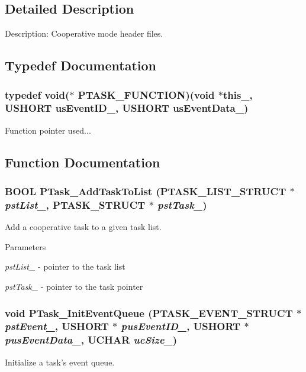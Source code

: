 \subsection{Detailed Description}
Description: Cooperative mode header files. 

\subsection{Typedef Documentation}
\subsubsection[{PTASK\_\-FUNCTION}]{\setlength{\rightskip}{0pt plus 5cm}typedef void($\ast$ {\bf PTASK\_\-FUNCTION})(void $\ast$this\_\-, USHORT usEventID\_\-, USHORT usEventData\_\-)}\label{ptask_8h_a3977bc20813d55ac4ad4d7bc9f50a3f2}


Function pointer used... 

\subsection{Function Documentation}
\subsubsection[{PTask\_\-AddTaskToList}]{\setlength{\rightskip}{0pt plus 5cm}BOOL PTask\_\-AddTaskToList ({\bf PTASK\_\-LIST\_\-STRUCT} $\ast$ {\em pstList\_\-}, \/  {\bf PTASK\_\-STRUCT} $\ast$ {\em pstTask\_\-})}\label{ptask_8h_a55c5177dafe03922b6fa944e2f2c3ee5}
Add a cooperative task to a given task list.


\begin{DoxyParams}{Parameters}
\item[{\em pstList\_\-}]-\/ pointer to the task list \item[{\em pstTask\_\-}]-\/ pointer to the task pointer \end{DoxyParams}
\subsubsection[{PTask\_\-InitEventQueue}]{\setlength{\rightskip}{0pt plus 5cm}void PTask\_\-InitEventQueue ({\bf PTASK\_\-EVENT\_\-STRUCT} $\ast$ {\em pstEvent\_\-}, \/  USHORT $\ast$ {\em pusEventID\_\-}, \/  USHORT $\ast$ {\em pusEventData\_\-}, \/  UCHAR {\em ucSize\_\-})}\label{ptask_8h_ac4d6c8726a09d28163d130e2127f5675}
Initialize a task's event queue.


